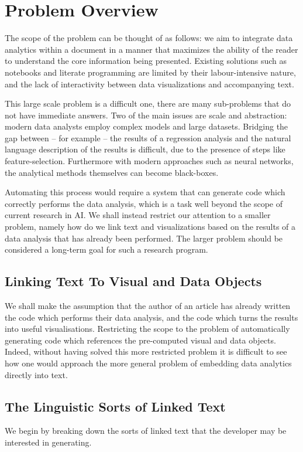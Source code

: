 \section{Problem Overview}
\label{sec:overview}

The scope of the problem can be thought of as follows: we aim to integrate data analytics within
a document in a manner that maximizes the ability of the reader to understand the core information
being presented. Existing solutions such as notebooks and literate programming are limited by their
labour-intensive nature, and the lack of interactivity between data visualizations and accompanying text.

This large scale problem is a difficult one, there are many sub-problems that do not have immediate answers.
Two of the main issues are scale and abstraction: modern data analysts employ complex models and large datasets.
Bridging the gap between -- for example -- the results of a regression analysis and the natural language description
of the results is difficult, due to the presence of steps like feature-selection. Furthermore with modern approaches
such as neural networks, the analytical methods themselves can become black-boxes.

Automating this process would require a system that can generate code which correctly performs the data analysis,
which is a task well beyond the scope of current research in AI. We shall instead restrict our attention to a smaller
problem, namely how do we link text and visualizations based on the results of a data analysis that has already been
performed. The larger problem should be considered a long-term goal for such a research program.

\subsection{Linking Text To Visual and Data Objects}
We shall make the assumption that the author of an article has already written the code which performs
their data analysis, and the code which turns the results into useful visualisations. Restricting the scope to the problem of
automatically generating code which references the pre-computed visual and data objects.
Indeed, without having solved this more restricted problem it is difficult to see how one would approach
the more general problem of embedding data analytics directly into text.

\subsection{The Linguistic Sorts of Linked Text}
We begin by breaking down the sorts of linked text that the developer may
be interested in generating. 

